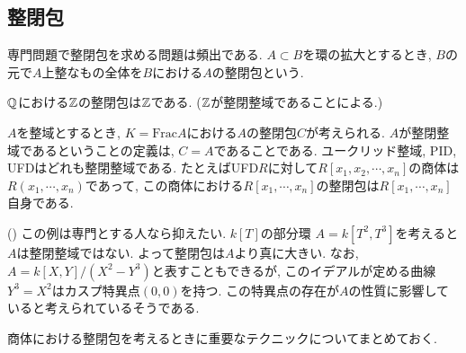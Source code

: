 \subsection{整閉包}
専門問題で整閉包を求める問題は頻出である.
$A\subset B$を環の拡大とするとき, $B$の元で$A$上整なもの全体を$B$における$A$の整閉包という.
\begin{eg}
\ben
\item $\mathbb{Q}$における$\mathbb{Z}$の整閉包は$\mathbb{Z}$である. ($\mathbb{Z}$が整閉整域であることによる.)
\item $A$を整域とするとき, $K=\mathrm{Frac}A$における$A$の整閉包$C$が考えられる. $A$が整閉整域であるということの定義は, $C=A$であることである. ユークリッド整域, PID, UFDはどれも整閉整域である. たとえばUFD$R$に対して$R[x_1,x_2,\cdots, x_n]$の商体は$R(x_1,\cdots, x_n)$であって, この商体における$R[x_1,\cdots, x_n]$の整閉包は$R[x_1,\cdots, x_n]$自身である.
\item () この例は専門とする人なら抑えたい. $k[T]$の部分環 $A=k[T^2,T^3]$を考えると$A$は整閉整域ではない.  よって整閉包は$A$より真に大きい. なお, $A = k[X,Y]/(X^2-Y^3)$と表すこともできるが, このイデアルが定める曲線$Y^3=X^2$はカスプ特異点$(0,0)$を持つ. この特異点の存在が$A$の性質に影響していると考えられているそうである.
\een
\end{eg}
商体における整閉包を考えるときに重要なテクニックについてまとめておく.

